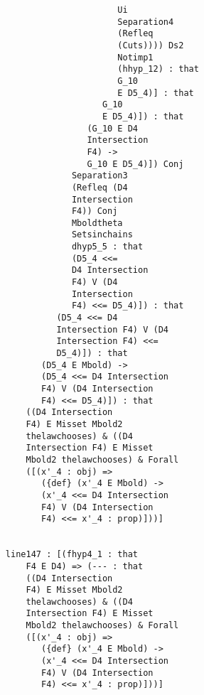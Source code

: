 \documentclass[12pt]{article}
\begin{document}
\begin{verbatim}
                                        Ui 
                                        Separation4 
                                        (Refleq 
                                        (Cuts)))) Ds2 
                                        Notimp1 
                                        (hhyp_12) : that 
                                        G_10 
                                        E D5_4)] : that 
                                     G_10 
                                     E D5_4)]) : that 
                                  (G_10 E D4 
                                  Intersection 
                                  F4) -> 
                                  G_10 E D5_4)]) Conj 
                               Separation3 
                               (Refleq (D4 
                               Intersection 
                               F4)) Conj 
                               Mboldtheta 
                               Setsinchains 
                               dhyp5_5 : that 
                               (D5_4 <<= 
                               D4 Intersection 
                               F4) V (D4 
                               Intersection 
                               F4) <<= D5_4)]) : that 
                            (D5_4 <<= D4 
                            Intersection F4) V (D4 
                            Intersection F4) <<= 
                            D5_4)]) : that 
                         (D5_4 E Mbold) -> 
                         (D5_4 <<= D4 Intersection 
                         F4) V (D4 Intersection 
                         F4) <<= D5_4)]) : that 
                      ((D4 Intersection 
                      F4) E Misset Mbold2 
                      thelawchooses) & ((D4 
                      Intersection F4) E Misset 
                      Mbold2 thelawchooses) & Forall 
                      ([(x'_4 : obj) => 
                         ({def} (x'_4 E Mbold) -> 
                         (x'_4 <<= D4 Intersection 
                         F4) V (D4 Intersection 
                         F4) <<= x'_4 : prop)]))]


                  line147 : [(fhyp4_1 : that 
                      F4 E D4) => (--- : that 
                      ((D4 Intersection 
                      F4) E Misset Mbold2 
                      thelawchooses) & ((D4 
                      Intersection F4) E Misset 
                      Mbold2 thelawchooses) & Forall 
                      ([(x'_4 : obj) => 
                         ({def} (x'_4 E Mbold) -> 
                         (x'_4 <<= D4 Intersection 
                         F4) V (D4 Intersection 
                         F4) <<= x'_4 : prop)]))]



\end{verbatim}
\end{document}

